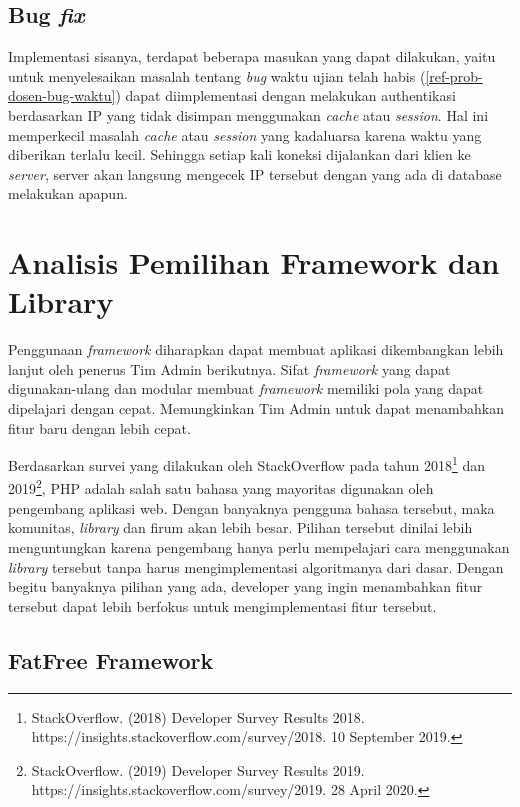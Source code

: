     \subsection{Bug \textit{fix}} Implementasi sisanya, terdapat beberapa
        masukan yang dapat dilakukan, yaitu untuk menyelesaikan masalah tentang
        \textit{bug} waktu ujian telah habis (\ref{ref-prob-dosen-bug-waktu})
        dapat diimplementasi dengan melakukan authentikasi berdasarkan IP yang
        tidak disimpan menggunakan \textit{cache} atau \textit{session}. Hal ini
        memperkecil masalah \textit{cache} atau \textit{session} yang kadaluarsa
        karena waktu yang diberikan terlalu kecil. Sehingga setiap kali koneksi
        dijalankan dari klien ke \textit{server}, server akan langsung mengecek
        IP tersebut dengan yang ada di database melakukan apapun.

\section{Analisis Pemilihan Framework dan Library}
Penggunaan \textit{framework} diharapkan dapat membuat aplikasi dikembangkan
lebih lanjut oleh penerus Tim Admin berikutnya. Sifat \textit{framework} yang
dapat digunakan-ulang dan modular membuat \textit{framework} memiliki pola yang
dapat dipelajari dengan cepat. Memungkinkan Tim Admin untuk dapat menambahkan
fitur baru dengan lebih cepat. 

Berdasarkan survei yang dilakukan oleh StackOverflow pada tahun
2018\footnote{StackOverflow. (2018) Developer Survey Results 2018.
https://insights.stackoverflow.com/survey/2018. 10 September 2019.} dan
2019\footnote{StackOverflow. (2019) Developer Survey Results 2019.
https://insights.stackoverflow.com/survey/2019. 28 April 2020.}, PHP adalah salah satu bahasa yang
mayoritas digunakan oleh pengembang aplikasi web. Dengan banyaknya pengguna
bahasa tersebut, maka komunitas, \textit{library} dan firum akan lebih besar.
Pilihan tersebut dinilai lebih menguntungkan karena pengembang hanya perlu
mempelajari cara menggunakan \textit{library} tersebut tanpa harus
mengimplementasi algoritmanya dari dasar. Dengan begitu banyaknya pilihan yang
ada, developer yang ingin menambahkan fitur tersebut dapat lebih berfokus untuk
mengimplementasi fitur tersebut.

\subsection{FatFree Framework}

